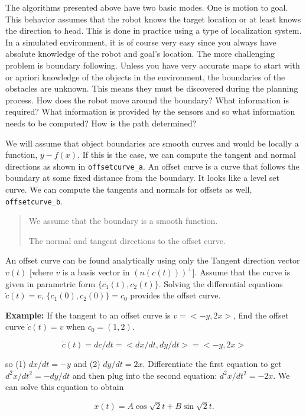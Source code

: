 The algorithms presented above have two basic modes. One is motion to
goal. This behavior assumes that the robot knows the target location or
at least knows the direction to head. This is done in practice using a
type of localization system. In a simulated environment, it is of course
very easy since you always have absolute knowledge of the robot and
goal's location. The more challenging problem is boundary following.
Unless you have very accurate maps to start with or apriori knowledge of
the objects in the environment, the boundaries of the obstacles are
unknown. This means they must be discovered during the planning process.
How does the robot move around the boundary? What information is
required? What information is provided by the sensors and so what
information needs to be computed? How is the path determined?

We will assume that object boundaries are smooth curves and would be
locally a function, \(y-f(x)\). If this is the case, we can compute the
tangent and normal directions as shown in \texttt{offsetcurve\_a}. An
offset curve is a curve that follows the boundary at some fixed distance
from the boundary. It looks like a level set curve. We can compute the
tangents and normals for offsets as well, \texttt{offsetcurve\_b}.

\begin{quote}
We assume that the boundary is a smooth function.

The normal and tangent directions to the offset curve.
\end{quote}

An offset curve can be found analytically using only the Tangent
direction vector \(v(t)\) {[}where \(v\) is a basis vector in
\((n(c(t)))^\perp\){]}. Assume that the curve is given in parametric
form \(\{c_1(t), c_2(t)\}\). Solving the differential equations
\(\dot{c}(t) = v\), \(\{c_1(0), c_2(0)\} = c_0\) provides the offset
curve.

\textbf{Example:} If the tangent to an offset curve is \(v = <-y, 2x>\),
find the offset curve \(\dot{c}(t) = v\) when \(c_0 = (1,2)\).

\[\dot{c}(t)=dc/dt = <dx/dt , dy/dt> = <-y,2x>\]

so (1) \(dx/dt = -y\) and (2) \(dy/dt = 2x\). Differentiate the first
equation to get \(d^2x/dt^2 = -dy/dt\) and then plug into the second
equation: \(d^2x/dt^2 = -2x\). We can solve this equation to obtain

\[x(t) = A\cos\sqrt{2}t + B\sin\sqrt{2}t.\]

